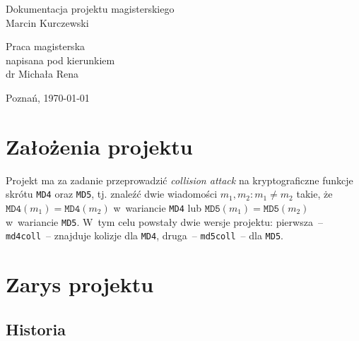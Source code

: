 \documentclass[12pt,a4paper,twoside]{article}
\begin{document}
\newcommand{\en}[1]{\textit{\enn{#1}}}
\newcommand{\enn}[1]{\foreignlanguage{english}{#1}}
\newcommand{\renmich}[1]{\textbullet{}\marginpar{\tiny \raggedright renmich{}: #1}}

\begin{titlepage}
    \begin{center}

    \vspace{1cm}
    {\Huge Dokumentacja projektu magisterskiego} \\[0.5cm]
    {\Large Marcin Kurczewski}
    \end{center}

    \vspace{3cm}
    \hspace{8cm}\parbox[l]{6cm}{\Large Praca magisterska \\
    napisana pod kierunkiem \\
    dr Michała Rena}

    \begin{center}
    \vspace{4cm}
    Poznań, \today
    \end{center}
\end{titlepage}

\section{Założenia projektu}

Projekt ma za zadanie przeprowadzić \en{collision attack} na kryptograficzne
funkcje skrótu \texttt{MD4} oraz \texttt{MD5}, tj. znaleźć dwie wiadomości
$m_1, m_2 : m_1 \neq m_2$ takie, że $\mathtt{MD4}(m_1) = \mathtt{MD4}(m_2)$
w~wariancie \texttt{MD4} lub $\mathtt{MD5}(m_1) = \mathtt{MD5}(m_2)$
w~wariancie \texttt{MD5}. W~tym celu powstały dwie wersje projektu: pierwsza~--
\texttt{md4coll}~-- znajduje kolizje dla \texttt{MD4}, druga~--
\texttt{md5coll}~-- dla \texttt{MD5}.

\section{Zarys projektu}

\subsection{Historia}
\end{document}
